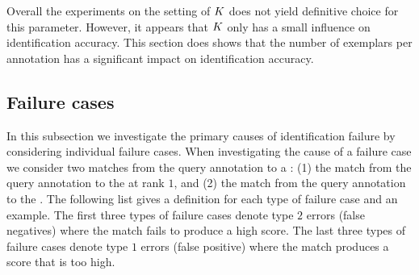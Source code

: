 
        Overall the experiments on the setting of $K$ does not yield definitive choice for this parameter.
        However, it appears that $K$ only has a small influence on identification accuracy.
        This section does shows that the number of exemplars per annotation has a significant impact on
          identification accuracy.

    \subsection{Failure cases}\label{sub:exptfail}  
        
        In this subsection we investigate the primary causes of identification failure by considering individual
          failure cases.
        When investigating the cause of a failure case we consider two matches from the query annotation to a
          \name{}:
        (1) the match from the query annotation to the \groundfalse{} \name{} at rank $1$, and
        (2) the match from the query annotation to the \groundtrue{} \name{}.
        The following list gives a definition for each type of failure case and an example.
        The first three types of failure cases denote type $2$ errors (false negatives) where the \groundtrue{}
          match fails to produce a high score.
        The last three types of failure cases denote type $1$ errors (false positive) where the \groundfalse{}
          match produces a score that is too high.

